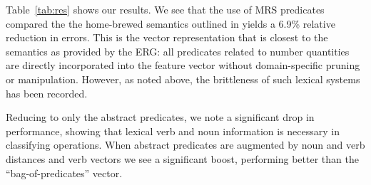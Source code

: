 Table~\ref{tab:res} shows our results. 
We see that the use of MRS predicates compared the the home-brewed semantics outlined in \cite{koncel2015parsing} yields a 6.9\% relative reduction in errors. 
This is the vector representation that is closest to the semantics as provided by the ERG: all predicates related to number quantities are directly incorporated into the feature vector without domain-specific pruning or manipulation.
However, as noted above, the brittleness of such lexical systems has been recorded. 

Reducing to only the abstract predicates, we note a significant drop in performance, showing that lexical verb and noun information is necessary in classifying operations. 
When abstract predicates are augmented by noun and verb distances and verb vectors we see a significant boost, performing better than the ``bag-of-predicates'' vector.
 

